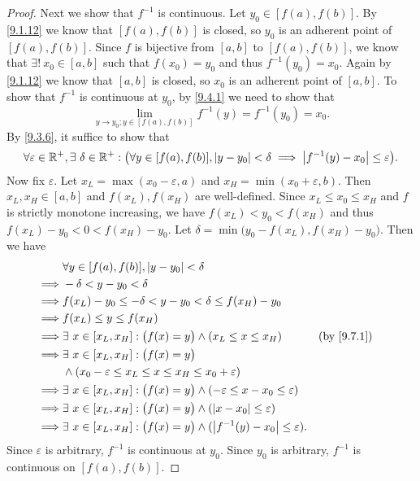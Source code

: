 \begin{proof}
  Next we show that \(f^{-1}\) is continuous.
  Let \(y_0 \in [f(a), f(b)]\).
  By \cref{9.1.12} we know that \([f(a), f(b)]\) is closed, so \(y_0\) is an adherent point of \([f(a), f(b)]\).
  Since \(f\) is bijective from \([a, b]\) to \([f(a), f(b)]\), we know that \(\exists!\ x_0 \in [a, b]\) such that \(f(x_0) = y_0\) and thus \(f^{-1}(y_0) = x_0\).
  Again by \cref{9.1.12} we know that \([a, b]\) is closed, so \(x_0\) is an adherent point of \([a, b]\).
  To show that \(f^{-1}\) is continuous at \(y_0\), by \cref{9.4.1} we need to show that
  \[
    \lim_{y \to y_0 ; y \in [f(a), f(b)]} f^{-1}(y) = f^{-1}(y_0) = x_0.
  \]
  By \cref{9.3.6}, it suffice to show that
  \[
    \forall \varepsilon \in \mathbb{R}^+, \exists\ \delta \in \mathbb{R}^+ : \big(\forall y \in [f(a), f(b)], \left\lvert y - y_0\right\rvert < \delta \implies \left\lvert f^{-1}(y) - x_0\right\rvert \leq \varepsilon\big).
  \]
  Now fix \(\varepsilon\).
  Let \(x_L = \max(x_0 - \varepsilon, a)\) and \(x_H = \min(x_0 + \varepsilon, b)\).
  Then \(x_L, x_H \in [a, b]\) and \(f(x_L), f(x_H)\) are well-defined.
  Since \(x_L \leq x_0 \leq x_H\) and \(f\) is strictly monotone increasing, we have \(f(x_L) < y_0 < f(x_H)\) and thus \(f(x_L) - y_0 < 0 < f(x_H) - y_0\).
  Let \(\delta = \min\big(y_0 - f(x_L), f(x_H) - y_0\big)\).
  Then we have
  \begin{align*}
             & \forall y \in [f(a), f(b)], \abs{y - y_0} < \delta                                                                \\
    \implies & -\delta < y - y_0 < \delta                                                                                        \\
    \implies & f(x_L) - y_0 \leq -\delta < y - y_0 < \delta \leq f(x_H) - y_0                                                    \\
    \implies & f(x_L) \leq y \leq f(x_H)                                                                                         \\
    \implies & \exists\ x \in [x_L, x_H] : \big(f(x) = y\big) \land (x_L \leq x \leq x_H)                        &  & \by{9.7.1} \\
    \implies & \exists\ x \in [x_L, x_H] : \big(f(x) = y\big)                                                                    \\
             & \land (x_0 - \varepsilon \leq x_L \leq x \leq x_H \leq x_0 + \varepsilon)                                         \\
    \implies & \exists\ x \in [x_L, x_H] : \big(f(x) = y\big) \land (-\varepsilon \leq x - x_0 \leq \varepsilon)                 \\
    \implies & \exists\ x \in [x_L, x_H] : \big(f(x) = y\big) \land (\abs{x - x_0} \leq \varepsilon)                             \\
    \implies & \exists\ x \in [x_L, x_H] : \big(f(x) = y\big) \land (\abs{f^{-1}(y) - x_0} \leq \varepsilon).
  \end{align*}
  Since \(\varepsilon\) is arbitrary, \(f^{-1}\) is continuous at \(y_0\).
  Since \(y_0\) is arbitrary, \(f^{-1}\) is continuous on \([f(a), f(b)]\).


\end{proof}
